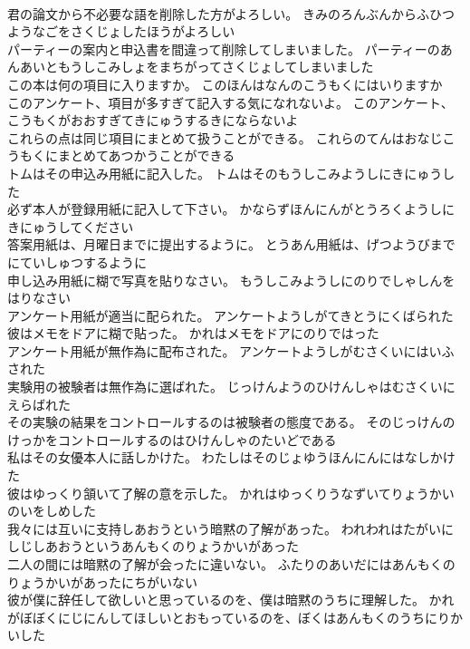 \documentclass[8pt]{extreport}
\begin{document}
\begin{CJK}{UTF8}{min}
\\	君の論文から不必要な語を削除した方がよろしい。	きみのろんぶんからふひつようなごをさくじょしたほうがよろしい 
\\	パーティーの案内と申込書を間違って削除してしまいました。	パーティーのあんあいともうしこみしょをまちがってさくじょしてしまいました 
\\	この本は何の項目に入りますか。	このほんはなんのこうもくにはいりますか 
\\	このアンケート、項目が多すぎて記入する気になれないよ。	このアンケート、こうもくがおおすぎてきにゅうするきにならないよ 
\\	これらの点は同じ項目にまとめて扱うことができる。	これらのてんはおなじこうもくにまとめてあつかうことができる 
\\	トムはその申込み用紙に記入した。	トムはそのもうしこみようしにきにゅうした 
\\	必ず本人が登録用紙に記入して下さい。	かならずほんにんがとうろくようしにきにゅうしてください 
\\	答案用紙は、月曜日までに提出するように。	とうあん用紙は、げつようびまでにていしゅつするように 
\\	申し込み用紙に糊で写真を貼りなさい。	もうしこみようしにのりでしゃしんをはりなさい 
\\	アンケート用紙が適当に配られた。	アンケートようしがてきとうにくばられた 
\\	彼はメモをドアに糊で貼った。	かれはメモをドアにのりではった 
\\	アンケート用紙が無作為に配布された。	アンケートようしがむさくいにはいふされた 
\\	実験用の被験者は無作為に選ばれた。	じっけんようのひけんしゃはむさくいにえらばれた 
\\	その実験の結果をコントロールするのは被験者の態度である。	そのじっけんのけっかをコントロールするのはひけんしゃのたいどである 
\\	私はその女優本人に話しかけた。	わたしはそのじょゆうほんにんにはなしかけた 
\\	彼はゆっくり頷いて了解の意を示した。	かれはゆっくりうなずいてりょうかいのいをしめした 
\\	我々には互いに支持しあおうという暗黙の了解があった。	われわれはたがいにしじしあおうというあんもくのりょうかいがあった 
\\	二人の間には暗黙の了解が会ったに違いない。	ふたりのあいだにはあんもくのりょうかいがあったにちがいない 
\\	彼が僕に辞任して欲しいと思っているのを、僕は暗黙のうちに理解した。	かれがぼぼくにじにんしてほしいとおもっているのを、ぼくはあんもくのうちにりかいした 

\end{CJK}
\end{document}
